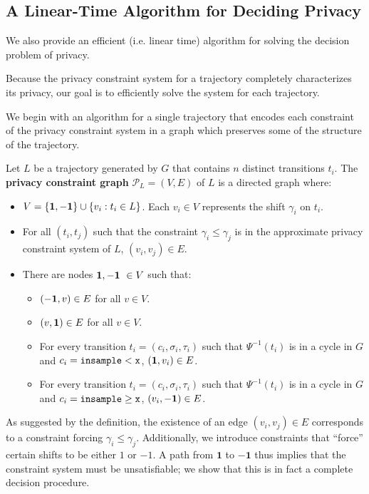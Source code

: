 
\subsection{A Linear-Time Algorithm for Deciding Privacy}\label{decisionSection}

We also provide an efficient (i.e. linear time) algorithm for solving the decision problem of privacy.

Because the privacy constraint system for a trajectory completely characterizes its privacy, our goal is to efficiently solve the system for each trajectory.

We begin with an algorithm for a single trajectory that encodes each constraint of the privacy constraint system in a graph which preserves some of the structure of the trajectory. 

\begin{defn}
    Let $L$ be a trajectory generated by $G$ that contains $n$ distinct transitions $t_i$. The \textbf{privacy constraint graph} $\mathcal{P}_L = (V, E)$ of $L$ is a directed graph where: 
    \begin{itemize}
        \item $V = \{{\bf 1, -1}\} \cup \{v_i: t_i\in L\}$. Each $v_i \in V$ represents the shift $\gamma_i$ on $t_i$.
        \item For all $(t_i, t_j)$ such that the constraint $\gamma_i \leq \gamma_j$ is in the approximate privacy constraint system of $L$, $(v_i, v_j) \in E$.
        \item There are nodes ${\bf 1, -1}\ \in V$ such that: 
        \begin{itemize}
            \item $({\bf -1}, v)\in E$ for all $v \in V$.
            \item $(v, {\bf 1})\in E$ for all $v \in V$.
            \item For every transition $t_i = (c_i, \sigma_i, \tau_i)$ such that $\Psi^{-1}(t_i)$ is in a cycle in $G$ and $c_i = \lguard[\texttt{x}]$, $({\bf 1}, v_i) \in E$.
            \item For every transition $t_i = (c_i, \sigma_i, \tau_i)$ such that $\Psi^{-1}(t_i)$ is in a cycle in $G$ and $c_i = \gguard[\texttt{x}]$, $(v_i, {\bf -1}) \in E$. 
        \end{itemize}
    \end{itemize}
\end{defn}

As suggested by the definition, the existence of an edge $(v_i, v_j)\in E$ corresponds to a constraint forcing $\gamma_i \leq \gamma_j$. Additionally, we introduce constraints that ``force'' certain shifts to be either $1$ or $-1$. 
A path from $\mathbf{1}$ to $\mathbf{-1}$ thus implies that the constraint system must be unsatisfiable; we show that this is in fact a complete decision procedure.

